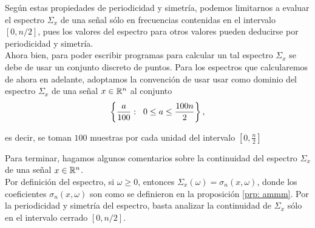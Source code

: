\begin{nota}
\label{nota: muestreo dom frecuencia}
Según estas propiedades de periodicidad y simetría,
podemos limitarnos a evaluar el espectro
$\Sigma_{x}$ de una señal sólo en frecuencias
contenidas en el intervalo $[0, n/2]$, pues los valores
del espectro para otros valores pueden deducirse por periodicidad
y simetría. \\

Ahora bien, para poder escribir programas
para calcular un tal espectro $\Sigma_{x}$
se debe de usar
un conjunto discreto de puntos.
Para los espectros que calcularemos de ahora en 
adelante, adoptamos la convención de 
usar usar como dominio 
del espectro
$\Sigma_{x}$ de una señal $x \in \mathbb{R}^{n}$
al conjunto
\begin{equation}
\label{eq: malla frecuencias}
\left\{ \frac{a}{100} : \hspace{0.2cm}
0 \leq a \leq \frac{100n}{2} \right\},
\end{equation}

es decir, se toman $100$ muestras por
cada unidad del intervalo 
$\left[ 0, \frac{n}{2}\right]$
\end{nota}


Para terminar, hagamos algunos comentarios
sobre la continuidad del espectro $\Sigma_{x}$
de una señal $x \in \mathbb{R}^{n}$. \\
Por definición del espectro, 
si $\omega \geq 0$, entonces
$\Sigma_{x}(\omega) = \sigma_{n} (x, \omega)$,
donde los coeficientes
$\sigma_{n} (x, \omega)$ son como se definieron en
la proposición \ref{prp: ammm}.
Por la periodicidad y simetría del espectro, basta
analizar la continuidad de $\Sigma_{x}$ sólo en el
intervalo cerrado $[0, n/2]$. \\

